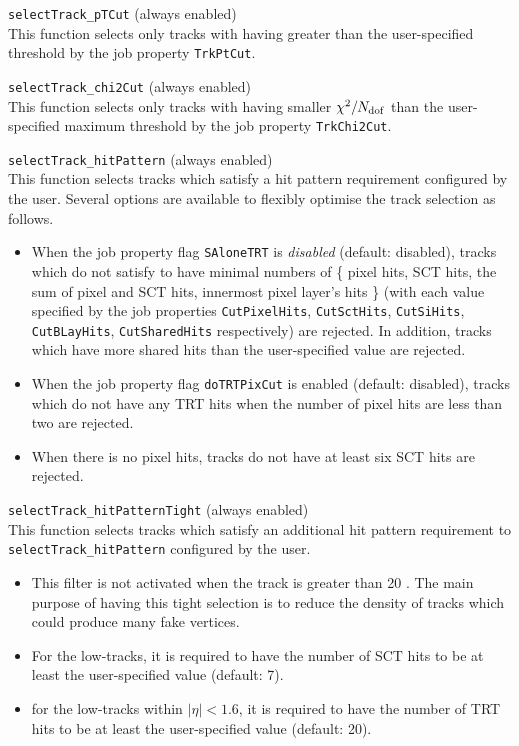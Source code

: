 \documentclass[NOTE, atlasdraft=true, texlive=2018, UKenglish]{\ATLASLATEXPATH atlasdoc}
\begin{document}
\begin{description}
\item{{\tt selectTrack\_pTCut} (always enabled)}\\This function selects only tracks with having greater \pt than the user-specified threshold by the job property {\tt TrkPtCut}.
\item{{\tt selectTrack\_chi2Cut} (always enabled)}\\ This function selects only tracks with having smaller $\chi^{2}/N_{\rm dof}$ than the user-specified maximum threshold by the job property {\tt TrkChi2Cut}.
\item{{\tt selectTrack\_hitPattern} (always enabled)}\\ This function selects tracks which satisfy a hit pattern requirement configured by the user. Several options are available to flexibly optimise the track selection as follows.
  \begin{itemize}
  \item When the job property flag {\tt SAloneTRT} is \emph{disabled} (default: disabled), tracks which do not satisfy to have minimal numbers of \{ pixel hits, SCT hits, the sum of pixel and SCT hits, innermost pixel layer's hits \} (with each value specified by the job properties {\tt CutPixelHits}, {\tt CutSctHits}, {\tt CutSiHits}, {\tt CutBLayHits}, {\tt CutSharedHits} respectively) are rejected. In addition, tracks which have more shared hits than the user-specified value are rejected.
  \item When the job property flag {\tt doTRTPixCut} is enabled (default: disabled), tracks which do not have any TRT hits when the number of pixel hits are less than two are rejected.
  \item When there is no pixel hits, tracks do not have at least six SCT hits are rejected.
  \end{itemize}

\item{{\tt selectTrack\_hitPatternTight} (always enabled)}\\ This function selects tracks which satisfy an additional hit pattern requirement to {\tt selectTrack\_hitPattern} configured by the user.
  \begin{itemize}
  \item This filter is not activated when the track \pt is greater than 20 \GeV. The main purpose of having this tight selection is to reduce the density of tracks which could produce many fake vertices.
  \item For the low-\pt tracks, it is required to have the number of SCT hits to be at least the user-specified value (default: 7).
  \item for the low-\pt tracks within $|\eta|<1.6$, it is required to have the number of TRT hits to be at least the user-specified value (default: 20).
  \end{itemize}


\end{description}
\end{document}

